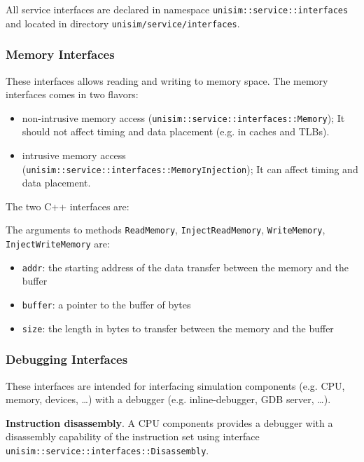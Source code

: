 All service interfaces are declared in namespace \texttt{unisim::service::interfaces} and located in directory \texttt{unisim/service/interfaces}.

\subsubsection{Memory Interfaces}

These interfaces allows reading and writing to memory space. The memory interfaces comes in two flavors:
\begin{itemize}
\item non-intrusive memory access (\texttt{unisim::service::interfaces::Memory}); It should not affect timing and data placement (e.g. in caches and TLBs).
\item intrusive memory access (\texttt{unisim::service::interfaces::MemoryInjection}); It can affect timing and data placement.
\end{itemize}

\noindent The two C++ interfaces are:

\begin{center}
	
\end{center}

\begin{center}
	
\end{center}

\noindent The arguments to methods \texttt{ReadMemory}, \texttt{InjectReadMemory}, \texttt{WriteMemory}, \texttt{InjectWriteMemory} are:
\begin{itemize}
\item \texttt{addr}: the starting address of the data transfer between the memory and the buffer
\item \texttt{buffer}: a pointer to the buffer of bytes
\item \texttt{size}: the length in bytes to transfer between the memory and the buffer
\end{itemize}

\subsubsection{Debugging Interfaces}

These interfaces are intended for interfacing simulation components (e.g. CPU, memory, devices, \ldots) with a debugger (e.g. inline-debugger, GDB server, \ldots).

\textbf{Instruction disassembly}. A CPU components provides a debugger with a disassembly capability of the instruction set using interface \texttt{unisim::service::interfaces::Disassembly}.

